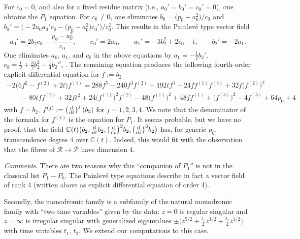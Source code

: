 \documentclass[10pt,a4paper]{amsart}
\numberwithin{equation}{section}
\begin{document}
 For $c_0=0$, and also for a fixed residue matrix (i.e., $a_0'=b_0'=c_0'=0$), one obtains the $P_1$ equation.
For $c_0\neq 0$, one eliminates $b_0=\bigl(p_0-a_0^2\bigr)/c_0$ and
$b_0'=\bigl(-2a_0a_0'c_0-\bigl(p_0-a_0^2\bigr)c_0'\bigr)/c_0^2$. This results in the Painlev\'e type vector field
\[a_0'=2b_2c_0-\frac{p_0-a_0^2}{c_0},\qquad c_0'=2a_0,\qquad a_1'=-3b_2^2+2c_0-t,\qquad b_2'=-2a_1.\]
One eliminates $a_0$, $a_1$, and $c_0$ in the above equations by
$a_1=-\frac{1}{2}b_2'$, $c_0=\frac{t}{2}+\frac{3}{2}b_2^2-\frac{1}{4}b_2''$, . The remaining equation produces the following fourth-order explicit differential equation for $f:=b_2$
 \begin{gather*}
 -2\bigl(6f^2-f^{(2)}+2t\bigr)f^{(4)}=288f^5-240f^3f^{(2)}+192tf^3-24ff^{(1)}f^{(3)}+32f\bigl(f^{(2)}\bigr)^2\\
 \qquad-80tff^{(2)}+32ft^2+
 24\bigl(f^{(1)}\bigr)^2f^{(2)} -48 \bigl(f^{(1)}\bigr)^2+48ff^{(1)}+\bigl(f^{(3)}\bigr)^2-4f^{(3)}+64p_0+4
\end{gather*}
with $f=b_2$, $f^{ (j) }:=\left( \frac{{\rm d}}{{\rm d}t} \right)^j (b_2)$ for $j=1,2,3,4$.
We note that the denominator of the formula for $f^{(4)}$ is the equation for $P_1$. It seems probable, but we have no proof, that
the field $\mathbb{C}(t)\bigl(b_2,\frac{{\rm d}}{{\rm d}t}b_2,\bigl(\frac{{\rm d}}{{\rm d}t}\bigr)^2b_2,\bigl(\frac{{\rm d}}{{\rm d}t}\bigr)^3b_2\bigr)$ has, for generic $p_0$, transcendence degree 4 over
$\mathbb{C}(t)$. Indeed, this would fit with the observation that the fibres of
$\mathcal{R}\rightarrow \mathcal{P}$ have dimension 4.

 {\it Comments}. There are two reasons why this ``companion of $P_1$'' is not in the classical list
$P_1-P_6$. The Painlev\'e type equations describe in fact a vector field of rank 4
(written above as explicit differential equation of order 4).

Secondly, the monodromic family is a subfamily of the natural monodromic family with ``two time variables''
given by the data: $z=0$ is regular singular and $z=\infty$ is irregular singular with generalized eigenvalues
$\pm \bigl(z^{5/2}+\frac{t_1}{2}z^{3/2}+\frac{t_2}{2}z^{1/2}\bigr)$ with time variables $t_1$, $t_2$. We extend our computations to this case.
\end{document}
